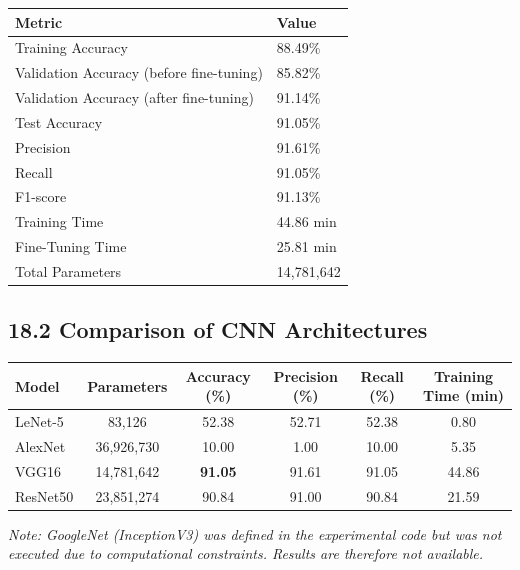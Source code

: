 \documentclass[11pt]{article}
\begin{document}
\begin{center}
\begin{tabular}{|p{6cm}|p{4cm}|}
\hline
Metric & Value\\
\hline
Training Accuracy                        & 88.49\% \\
\hline
Validation Accuracy (before fine-tuning) & 85.82\% \\
\hline
Validation Accuracy (after fine-tuning)  & 91.14\% \\
\hline
Test Accuracy                            & 91.05\% \\
\hline
Precision                                & 91.61\% \\
\hline
Recall                                   & 91.05\% \\
\hline
F1-score                                 & 91.13\% \\
\hline
Training Time                            & 44.86 min \\
\hline
Fine-Tuning Time                         & 25.81 min \\
\hline
Total Parameters                         & 14,781,642 \\
\hline
\end{tabular}
\end{center}

\vspace{4mm}

\subsection*{18.2 Comparison of CNN Architectures}

\begin{center}
\begin{tabular}{|l|c|c|c|c|c|}
\hline
Model & Parameters & Accuracy (\%) & Precision (\%) & Recall (\%) & Training Time (min)\\
\hline
LeNet-5  & 83,126     & 52.38 & 52.71 & 52.38 & 0.80  \\
\hline
AlexNet  & 36,926,730 & 10.00 &  1.00 & 10.00 & 5.35  \\
\hline
VGG16    & 14,781,642 & \textbf{91.05} & 91.61 & 91.05 & 44.86 \\
\hline
ResNet50 & 23,851,274 & 90.84 & 91.00 & 90.84 & 21.59 \\
\hline
\end{tabular}

\noindent\small\textit{Note: GoogleNet (InceptionV3) was defined in the experimental code but was not executed due to computational constraints. Results are therefore not available.}
\end{center}
\end{document}
